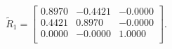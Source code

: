 \begin{equation*}
\widetilde{R}_{1} = 
\begin{bmatrix}
  0.8970 &  -0.4421 &  -0.0000 \\
  0.4421 &   0.8970 &  -0.0000 \\
  0.0000 &  -0.0000 &   1.0000 \\
\end{bmatrix}.
\end{equation*}
